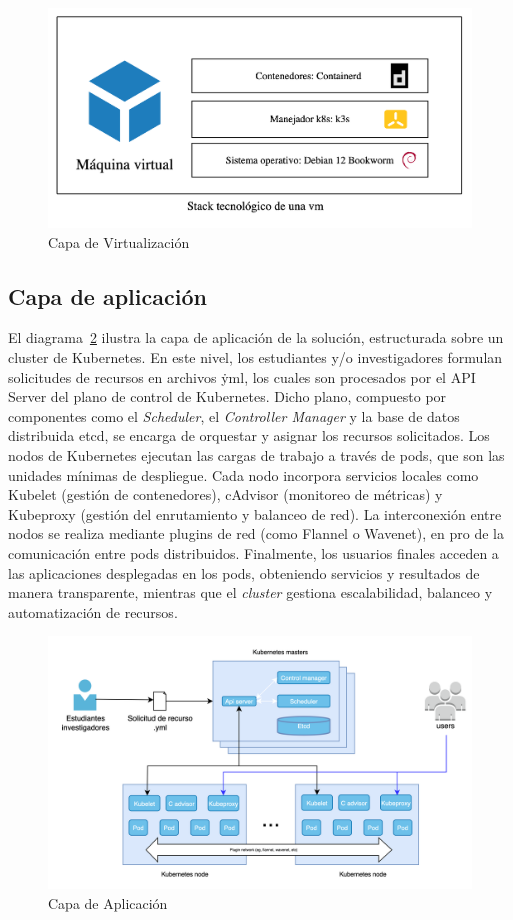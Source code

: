 \begin{figure}[H]
    \centering
    \includegraphics[width=\textwidth]{tablas-images/cp6/disenio-N2-B.png}
    \caption{Capa de Virtualización}\label{fig:virtualizacion}
\end{figure}

\subsection{Capa de aplicación}
\noindent
El diagrama~\ref{fig:aplicacion} ilustra la capa de aplicación de la solución, estructurada sobre un cluster de Kubernetes. En este nivel, los estudiantes y/o investigadores formulan solicitudes de recursos en archivos \.yml, los cuales son procesados por el API Server del plano de control de Kubernetes. Dicho plano, compuesto por componentes como el \textit{Scheduler}, el \textit{Controller Manager} y la base de datos distribuida etcd, se encarga de orquestar y asignar los recursos solicitados.
Los nodos de Kubernetes ejecutan las cargas de trabajo a través de pods, que son las unidades mínimas de despliegue. Cada nodo incorpora servicios locales como Kubelet (gestión de contenedores), cAdvisor (monitoreo de métricas) y Kubeproxy (gestión del enrutamiento y balanceo de red). La interconexión entre nodos se realiza mediante plugins de red (como Flannel o Wavenet), en pro de la comunicación entre pods distribuidos.
Finalmente, los usuarios finales acceden a las aplicaciones desplegadas en los pods, obteniendo servicios y resultados de manera transparente, mientras que el \textit{cluster} gestiona escalabilidad, balanceo y automatización de recursos.
\begin{figure}[H]
    \centering
    \includegraphics[width=\textwidth]{tablas-images/cp6/disenio-N3.png}
    \caption{Capa de Aplicación}\label{fig:aplicacion}
\end{figure}
